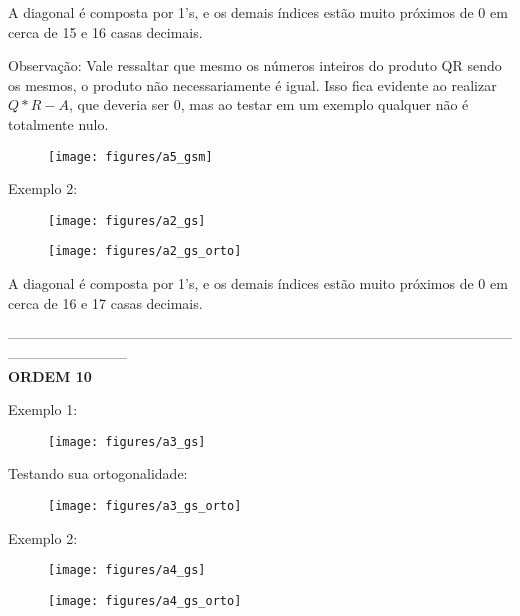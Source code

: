 \documentclass[leqno]{article}
\numberwithin{equation}{section}
\begin{document}
	A diagonal é composta por 1's, e os demais índices estão muito próximos de 0 em cerca de 15 e 16 casas decimais.


	Observação: Vale ressaltar que mesmo os números inteiros do produto QR sendo os mesmos, o produto não necessariamente é igual. Isso fica evidente ao realizar $Q*R - A$, que deveria ser 0, mas ao testar em um exemplo qualquer não é totalmente nulo.
	
	\begin{figure}[H]
		\centering
		\texttt{[image: figures/a5\_gsm]}		
	\end{figure}

	
	Exemplo 2:
	
	\begin{figure}[H]
		\centering
		\texttt{[image: figures/a2\_gs]}
	\end{figure}

	\begin{figure}[H]
		\centering
		\texttt{[image: figures/a2\_gs\_orto]}		
	\end{figure}

	A diagonal é composta por 1's, e os demais índices estão muito próximos de 0 em cerca de 16 e 17 casas decimais.

	
	--------------------------------------------------------------------------------------------------------------------------------------\\
	
	\textbf{{\large ORDEM 10}}
	
	Exemplo 1:
	
	\begin{figure}[H]
		\centering
		\texttt{[image: figures/a3\_gs]}		
	\end{figure}

	
	Testando sua ortogonalidade:
	
	\begin{figure}[H]
		\centering
		\texttt{[image: figures/a3\_gs\_orto]}		
	\end{figure}
	\newpage
	Exemplo 2:
	
	\begin{figure}[H]
		\centering
		\texttt{[image: figures/a4\_gs]}		
	\end{figure}
	
	\begin{figure}[H]
		\centering
		\texttt{[image: figures/a4\_gs\_orto]}		
	\end{figure}
\end{document}
